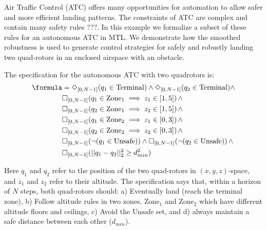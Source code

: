 
Air Traffic Control (ATC) offers many opportunities for automation to allow safer and more efficient landing patterns. 
The constraints of ATC are complex and contain many safety rules \cite{}???. 
In this example we formalize a subset of these rules for an autonomous ATC in MTL.
We demonstrate how the smoothed robustness is used to generate control strategies for safely and robustly landing two quad-rotors in an enclosed airspace with an obstacle. 

The specification for the autonomous ATC with two quadrotors is:
{\small
\begin{subequations}
\begin{align}
\formula &= \eventually_{[0,N-1]}(q_1 \in \text{Terminal}) \land \eventually_{[0,N-1]}(q_2 \in \text{Terminal}) \land   \nonumber \\
& \always_{[0,N-1]} (q_1 \in \text{Zone}_1 \implies z_1 \in [1,5]) \, \land \nonumber \\
& \always_{[0,N-1]} (q_2 \in \text{Zone}_1 \implies z_2 \in [1,5]) \, \land \nonumber \\
& \always_{[0,N-1]} (q_1 \in \text{Zone}_2 \implies z_1 \in [0,3]) \, \land \nonumber \\
& \always_{[0,N-1]} (q_2 \in \text{Zone}_2 \implies z_2 \in [0,3]) \, \land \nonumber \\
& \always_{[0,N-1]} (\neg (q_1 \in \text{Unsafe})) \land \always_{[0,N-1]} (\neg (q_2 \in \text{Unsafe})) \, \land  \nonumber \\
& \always_{[0,N-1]} (||q_1-q_2||_2^2 \geq d_{min}^2)
\end{align}
\end{subequations}
}

Here $q_1$ and $q_2$ refer to the position of the two quad-rotors in $(x,y,z)$-space, and $z_1$ and $z_2$ refer to their altitude. The specification says that, within a horizon of $N$ steps,  both quad-rotors 
should: 
a) Eventually land (reach the terminal zone), 
b) Follow altitude rules in two zones, $\text{Zone}_1$ and $\text{Zone}_2$ which have different altitude floors and ceilings,
c) Avoid the $\text{Unsafe}$ set, and d) always maintain a safe distance between each other ($d_{min}$). 

